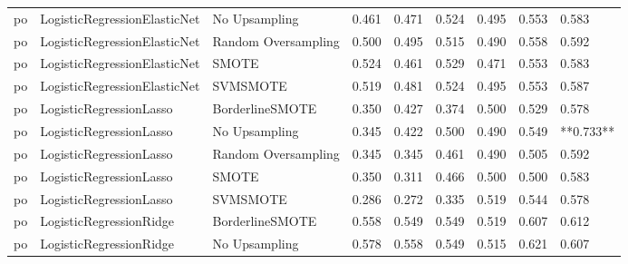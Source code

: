 \begin{tabular}{lllllllll}
      po & LogisticRegressionElasticNet &       No Upsampling &     0.461 &                     0.471 &                 0.524 &                  0.495 &                                   0.553 &     0.583 \\
      po & LogisticRegressionElasticNet & Random Oversampling &     0.500 &                     0.495 &                 0.515 &                  0.490 &                                   0.558 &     0.592 \\
      po & LogisticRegressionElasticNet &               SMOTE &     0.524 &                     0.461 &                 0.529 &                  0.471 &                                   0.553 &     0.583 \\
      po & LogisticRegressionElasticNet &            SVMSMOTE &     0.519 &                     0.481 &                 0.524 &                  0.495 &                                   0.553 &     0.587 \\
      po &      LogisticRegressionLasso &     BorderlineSMOTE &     0.350 &                     0.427 &                 0.374 &                  0.500 &                                   0.529 &     0.578 \\
      po &      LogisticRegressionLasso &       No Upsampling &     0.345 &                     0.422 &                 0.500 &                  0.490 &                                   0.549 & **0.733** \\
      po &      LogisticRegressionLasso & Random Oversampling &     0.345 &                     0.345 &                 0.461 &                  0.490 &                                   0.505 &     0.592 \\
      po &      LogisticRegressionLasso &               SMOTE &     0.350 &                     0.311 &                 0.466 &                  0.500 &                                   0.500 &     0.583 \\
      po &      LogisticRegressionLasso &            SVMSMOTE &     0.286 &                     0.272 &                 0.335 &                  0.519 &                                   0.544 &     0.578 \\
      po &      LogisticRegressionRidge &     BorderlineSMOTE &     0.558 &                     0.549 &                 0.549 &                  0.519 &                                   0.607 &     0.612 \\
      po &      LogisticRegressionRidge &       No Upsampling &     0.578 &                     0.558 &                 0.549 &                  0.515 &                                   0.621 &     0.607 \\

\end{tabular}
